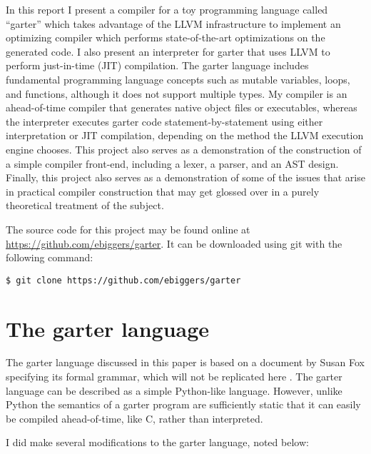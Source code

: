 \documentclass[11pt]{article}
\begin{document}
    In this report I present a compiler for a toy
    programming language called ``garter'' which takes advantage of the LLVM
    infrastructure to implement an optimizing compiler which performs
    state-of-the-art optimizations on the generated code.  I also present an
    interpreter for garter that uses LLVM to perform just-in-time (JIT)
    compilation.
The garter language includes fundamental programming language concepts such as
mutable variables, loops, and functions, although it does not support multiple
types.  My compiler is an ahead-of-time compiler that generates native object
files or executables, whereas the interpreter executes garter code
statement-by-statement using either interpretation or JIT compilation, depending
on the method the LLVM execution engine chooses.  This project also serves as a
demonstration of the construction of a simple compiler front-end, including a
lexer, a parser, and an AST design.  Finally, this project also serves as a
demonstration of some of the issues that arise in practical compiler
construction that may get glossed over in a purely theoretical treatment of the
subject.

The source code for this project may be found online at
\url{https://github.com/ebiggers/garter}.  It can be downloaded using git with
the following command:

\begin{verbatim}
$ git clone https://github.com/ebiggers/garter
\end{verbatim}

\section{The garter language}

The garter language discussed in this paper is based on a document by Susan Fox
specifying its formal grammar, which will not be replicated here \cite{garter}.
The garter language can be described as a simple Python-like language.  However,
unlike Python the semantics of a garter program are sufficiently static that it
can easily be compiled ahead-of-time, like C, rather than interpreted.

I did make several modifications to the garter language, noted below:
\end{document}
